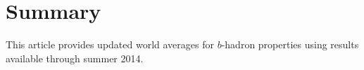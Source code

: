 \clearpage

\section{Summary}
\label{sec:summary}

This article provides updated world averages for 
$b$-hadron properties using results available through summer 2014. 

